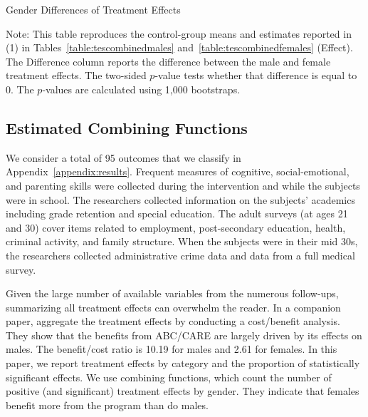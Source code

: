 \begin{table}
\centering
\begin{threeparttable}
\caption{Gender Differences of Treatment Effects}\label{table:genderdifference-tes}
\begin{scriptsize}

\end{scriptsize}
\begin{tablenotes}
\scriptsize
Note: This table reproduces the control-group means and estimates reported in (1) in Tables~\ref{table:tescombinedmales} and~\ref{table:tescombinedfemales} (Effect). The Difference column reports the difference between the male and female treatment effects. The two-sided $p$-value tests whether that difference is equal to 0. The $p$-values are calculated using 1,000 bootstraps. 
\end{tablenotes}
\end{threeparttable}
\end{table}

\subsection{Estimated Combining Functions}

We consider a total of 95 outcomes that we classify in Appendix~\ref{appendix:results}. Frequent measures of cognitive, social-emotional, and parenting skills were collected during the intervention and while the subjects were in school. The researchers collected information on the subjects' academics including grade retention and special education. The adult surveys (at ages 21 and 30) cover items related to employment, post-secondary education, health, criminal activity, and family structure. When the subjects were in their mid 30s, the researchers collected administrative crime data and data from a full medical survey.

Given the large number of available variables from the numerous follow-ups, summarizing all treatment effects can overwhelm the reader. In a companion paper, \citet{Garcia_Heckman_Leaf_etal_2017_Comp_CBA_Unpublished} aggregate the treatment effects by conducting a cost/benefit analysis. They show that the benefits from ABC/CARE are largely driven by its effects on males. The benefit/cost ratio is 10.19 for males and 2.61 for females. In this paper, we report treatment effects by category and the proportion of statistically significant effects. We use combining functions, which count the number of positive (and significant) treatment effects by gender. They indicate that females benefit more from the program than do males.

